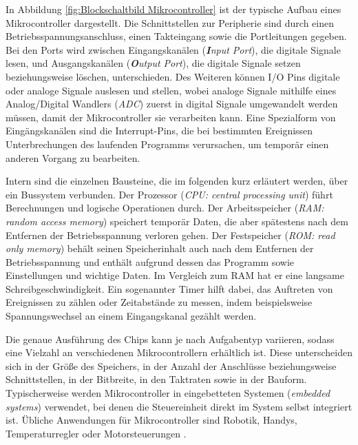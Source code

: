 In Abbildung \ref{fig:Blockschaltbild Mikrocontroller} ist der typische Aufbau eines Mikrocontroller dargestellt. Die Schnittstellen zur Peripherie sind durch einen Betriebsspannungsanschluss, einen Takteingang sowie die Portleitungen  gegeben. Bei den Ports wird zwischen Eingangskanälen (\textit{\textbf{I}nput Port}), die digitale Signale lesen, und Ausgangskanälen (\textit{\textbf{O}utput Port}), die digitale Signale setzen beziehungsweise löschen, unterschieden. Des Weiteren können I/O Pins digitale oder analoge Signale auslesen und stellen, wobei analoge Signale mithilfe eines Analog/Digital Wandlers (\textit{ADC}) zuerst in digital Signale umgewandelt werden müssen, damit der Mikrocontroller sie verarbeiten kann.
Eine Spezialform von Eingängskanälen sind die Interrupt-Pins, die bei bestimmten Ereignissen Unterbrechungen des laufenden Programms verursachen, um temporär einen anderen Vorgang zu bearbeiten. 

Intern sind die einzelnen Bausteine, die im folgenden kurz erläutert werden, über ein Bussystem verbunden.
Der Prozessor (\textit{CPU: central processing unit}) führt Berechnungen und logische Operationen durch.
Der Arbeitsspeicher (\textit{RAM: random access memory}) speichert temporär Daten, die aber spätestens nach dem Entfernen der Betriebsspannung verloren gehen.
Der Festspeicher (\textit{ROM: read only memory}) behält seinen Speicherinhalt auch nach dem Entfernen der Betriebsspannung und enthält aufgrund dessen das Programm sowie Einstellungen und wichtige Daten. Im Vergleich zum RAM hat er eine langsame Schreibgeschwindigkeit. 
Ein sogenannter Timer hilft dabei, das Auftreten von Ereignissen zu zählen oder Zeitabstände zu messen, indem beispielsweise Spannungswechsel an einem Eingangskanal gezählt werden. 

Die genaue Ausführung des Chips kann je nach Aufgabentyp variieren, sodass eine Vielzahl an verschiedenen Mikrocontrollern erhältlich ist. Diese unterscheiden sich in der Größe des Speichers, in der Anzahl der Anschlüsse beziehungsweise Schnittstellen, in der Bitbreite, in den Taktraten sowie in der Bauform. Typischerweise werden Mikrocontroller in eingebetteten Systemen (\textit{embedded systems}) verwendet, bei denen die Steuereinheit direkt im System selbst integriert ist. Übliche Anwendungen für Mikrocontroller sind Robotik, Handys, Temperaturregler oder Motorsteuerungen \cite{Brinkschulte}. 

